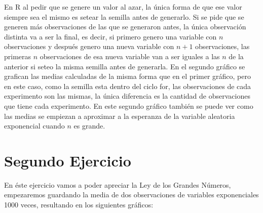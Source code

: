 \documentclass[a4paper]{article}
\begin{document}
	En R al pedir que se genere un valor al azar, la \'unica forma de que ese valor siempre sea el mismo es setear la semilla antes de generarlo. Si se pide que se generen m\'as observaciones de las que se generaron antes, la \'unica observaci\'on distinta va a ser la final, es decir, si primero genero una variable con $n$ observaciones y despu\'es genero una nueva variable con $n+1$ observaciones, las primeras $n$ observaciones de esa nueva variable van a ser iguales a las $n$ de la anterior si seteo la misma semilla antes de generarla.
	En el segundo gr\'afico se grafican las medias calculadas de la misma forma que en el primer gr\'afico, pero en este caso, como la semilla esta dentro del ciclo for, las observaciones de cada experimento son las mismas, la \'unica diferencia es la cantidad de observaciones que tiene cada experimento.
	En este segundo gr\'afico tambi\'en se puede ver como las medias se empiezan a aproximar a la esperanza de la variable aleatoria exponencial cuando $n$ es grande.
	\newpage
	
	\section{Segundo Ejercicio}
	
	En \'este ejercicio vamos a poder apreciar la Ley de los Grandes N\'umeros, empezaremos guardando la media de dos observaciones de variables exponenciales 1000 veces, resultando en los siguientes gr\'aficos:
	
\end{document}
